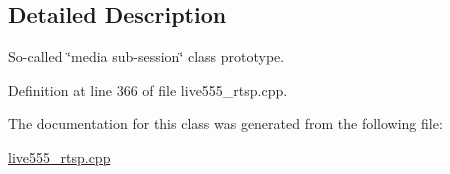 \subsection{Detailed Description}
So-\/called \char`\"{}media sub-\/session\char`\"{} class prototype. 

Definition at line 366 of file live555\+\_\+rtsp.\+cpp.



The documentation for this class was generated from the following file\+:\begin{DoxyCompactItemize}
\item 
\hyperlink{live555__rtsp_8cpp}{live555\+\_\+rtsp.\+cpp}\end{DoxyCompactItemize}
